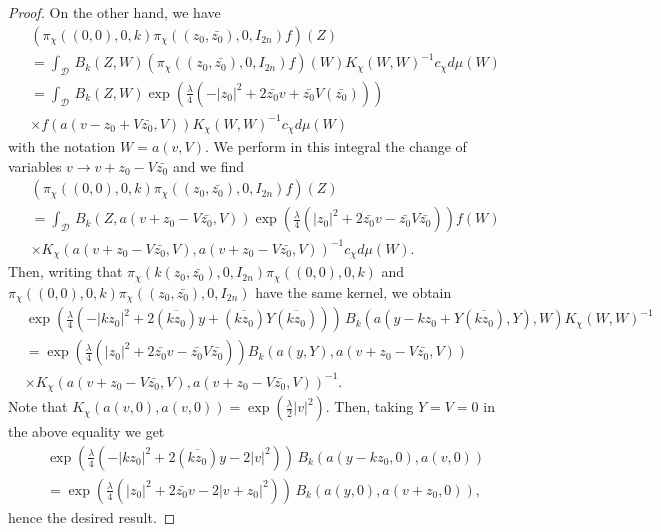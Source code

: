 \documentclass[12pt]{amsart}
\numberwithin{equation}{section}
\begin{document}
\begin{proof}
On the other hand, we have
\begin{align*}&(\pi_{\chi}((0,0),0,k)\pi_{\chi}((z_0,\bar{z_0}),0,I_{2n})f)(Z)\\
&= \int_{\mathcal D}\,B_k(Z,W)(\pi_{\chi}((z_0,\bar{z_0}),0,I_{2n})f)(W)
K_{\chi}(W,W)^{-1}c_{\chi}d\mu (W)\\
&=\int_{\mathcal D}\,B_k(Z,W)
\exp \left(  \tfrac{\lambda}{4}\left(-\vert z_0\vert^2+2\bar{z_0}v+
\bar{z_0}V(\bar{z_0})\right)\right)\\
& \times
f(a(v-z_0+V\bar{z_0},V))
K_{\chi}(W,W)^{-1}c_{\chi}d\mu (W)
\end{align*}
with the notation $W=a(v,V)$. We perform in this integral the change of variables
$v\rightarrow v+z_0-V\bar{z_0}$ and we find
\begin{align*}&(\pi_{\chi}((0,0),0,k)\pi_{\chi}((z_0,\bar{z_0}),0,I_{2n})f)(Z)\\
&=\int_{\mathcal D}\,B_k(Z,a(v+z_0-V\bar{z_0},V))
\exp \left(  \tfrac{\lambda}{4}\left(\vert z_0\vert^2+2\bar{z_0}v-
\bar{z_0}V\bar{z_0}\right)\right)f(W)\\
&\times K_{\chi}(a(v+z_0-V\bar{z_0},V),a(v+z_0-V\bar{z_0},V))^{-1}c_{\chi}d\mu (W).
\end{align*}
Then, writing that
$\pi_{\chi}(k(z_0,\bar{z_0}),0,I_{2n})\pi_{\chi}((0,0),0,k)$ and $\pi_{\chi}((0,0),0,k)\pi_{\chi}((z_0,\bar{z_0}),0,I_{2n})$ have the same kernel, we obtain 
\begin{align*}
&\exp \left(  \tfrac{\lambda}{4}\left(-\vert kz_0\vert^2+2(\overline{kz_0})y+
(\overline{kz_0})Y(\overline{kz_0})\right)\right)\, B_k(a(y-kz_0+Y(\overline{kz_0}),Y),W)
K_{\chi}(W,W)^{-1}\\
&=\exp \left(  \tfrac{\lambda}{4}\left(\vert z_0\vert^2+2\bar{z_0}v-
\bar{z_0}V\bar{z_0}\right)\right)B_k(a(y,Y),a(v+z_0-V\bar{z_0},V))\\
&\times  K_{\chi}(a(v+z_0-V\bar{z_0},V),a(v+z_0-V\bar{z_0},V))^{-1}.
\end{align*}
Note that $K_{\chi}(a(v,0),a(v,0))=\exp\left(\tfrac{\lambda}{2}\vert v \vert^2\right)$.
Then, taking $Y=V=0$ in the above equality we get
\begin{align*}
&\exp \left(  \tfrac{\lambda}{4}\left(-\vert kz_0\vert^2+2(\overline{kz_0})y-2
\vert v \vert^2\right)\right)\, B_k(a(y-kz_0,0),a(v,0))\\
&=\exp \left(  \tfrac{\lambda}{4}\left(\vert z_0\vert^2+2\bar{z_0}v-
2\vert v+z_0\vert^2\right)\right)\,B_k(a(y,0),a(v+z_0,0)),
\end{align*} hence the desired result.
\end{proof}
\end{document}
